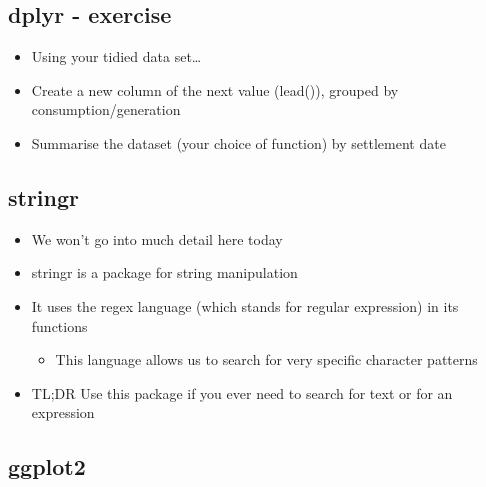 \documentclass[]{article}
\providecommand{\tightlist}{%
  \setlength{\itemsep}{0pt}\setlength{\parskip}{0pt}}
\begin{document}
\subsection{dplyr - exercise}\label{dplyr---exercise}

\begin{itemize}
\tightlist
\item
  Using your tidied data set\ldots{}
\item
  Create a new column of the next value (lead()), grouped by
  consumption/generation
\item
  Summarise the dataset (your choice of function) by settlement date
\end{itemize}

\subsection{stringr}\label{stringr}

\begin{itemize}
\tightlist
\item
  We won't go into much detail here today
\item
  stringr is a package for string manipulation
\item
  It uses the regex language (which stands for regular expression) in
  its functions

  \begin{itemize}
  \tightlist
  \item
    This language allows us to search for very specific character
    patterns
  \end{itemize}
\item
  TL;DR Use this package if you ever need to search for text or for an
  expression
\end{itemize}

\subsection{ggplot2}\label{ggplot2}
\end{document}
